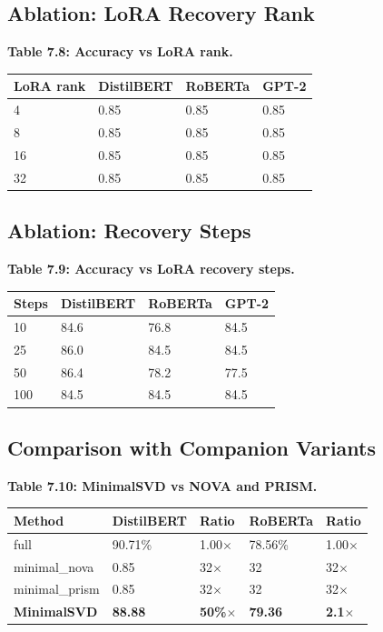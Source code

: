 \subsection{Ablation: LoRA Recovery Rank}

\textbf{Table 7.8: Accuracy vs LoRA rank.}

\begin{table}[H]
\centering
\small
\begin{tabular}{llll}
\toprule
\textbf{LoRA rank} & \textbf{DistilBERT} & \textbf{RoBERTa} & \textbf{GPT-2} \\
\midrule
4 & 0.85 & 0.85 & 0.85 \\
8 & 0.85 & 0.85 & 0.85 \\
16 & 0.85 & 0.85 & 0.85 \\
32 & 0.85 & 0.85 & 0.85 \\
\bottomrule
\end{tabular}
\end{table}

\subsection{Ablation: Recovery Steps}

\textbf{Table 7.9: Accuracy vs LoRA recovery steps.}

\begin{table}[H]
\centering
\small
\begin{tabular}{llll}
\toprule
\textbf{Steps} & \textbf{DistilBERT} & \textbf{RoBERTa} & \textbf{GPT-2} \\
\midrule
10 & 84.6 & 76.8 & 84.5 \\
25 & 86.0 & 84.5 & 84.5 \\
50 & 86.4 & 78.2 & 77.5 \\
100 & 84.5 & 84.5 & 84.5 \\
\bottomrule
\end{tabular}
\end{table}

\subsection{Comparison with Companion Variants}

\textbf{Table 7.10: MinimalSVD vs NOVA and PRISM.}

\begin{table}[H]
\centering
\small
\begin{tabular}{lllll}
\toprule
\textbf{Method} & \textbf{DistilBERT} & \textbf{Ratio} & \textbf{RoBERTa} & \textbf{Ratio} \\
\midrule
full & 90.71\% & 1.00$\times$ & 78.56\% & 1.00$\times$ \\
minimal\_nova & 0.85 & 32$\times$ & 32 & 32$\times$ \\
minimal\_prism & 0.85 & 32$\times$ & 32 & 32$\times$ \\
\textbf{MinimalSVD} & \textbf{88.88} & \textbf{50\%$\times$} & \textbf{79.36} & \textbf{2.1$\times$} \\
\bottomrule
\end{tabular}
\end{table}

